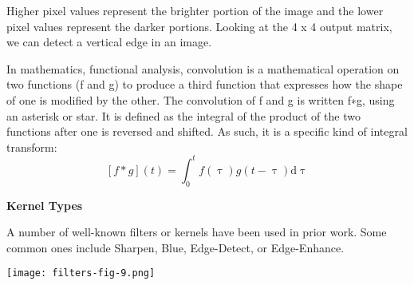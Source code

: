 Higher pixel values represent the brighter portion of the image and the lower pixel values represent the darker portions. Looking at the 4 x 4 output matrix, we can detect a vertical edge in an image.
\par
In mathematics, functional analysis,  convolution is a mathematical operation on two functions (f and g) to produce a third function that expresses how the shape of one is modified by the other. The convolution of f and g is written f∗g, using an asterisk or star. It is defined as the integral of the product of the two functions after one is reversed and shifted. As such, it is a specific kind of integral transform:
$$ [f*g](t) = \int_{0}^{t} f(\uptau) g(t - \uptau) \mathrm{d} \uptau $$


\begin{flushleft}
  \textbf{Kernel Types}
\end{flushleft}

A number of well-known filters or kernels have been used in prior work. Some common ones include Sharpen, Blue, Edge-Detect, or Edge-Enhance.

\texttt{[image: filters-fig-9.png]}
